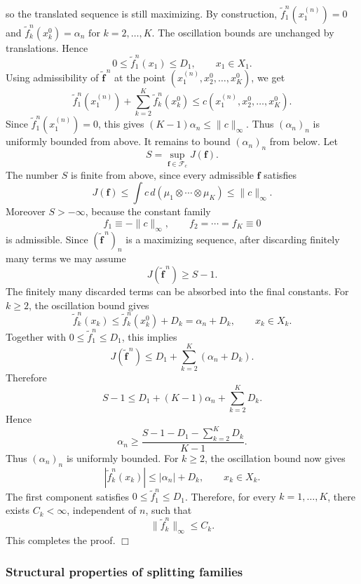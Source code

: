 \documentclass[twoside,11pt,a4paper]{article}
\begin{document}
so the translated sequence is still maximizing.
By construction, $
\widetilde f_1^n(x_1^{(n)})=0$
and $
\widetilde f_k^n(x_k^0)=\alpha_n
\text{ for } k=2,\ldots,K$.
The oscillation bounds are unchanged by translations. Hence
\[
0\le \widetilde f_1^n(x_1)\le D_1,
\qquad x_1\in X_1.
\]
Using admissibility of \(\widetilde{\boldsymbol f}^{\,n}\) at the point
\((x_1^{(n)},x_2^0,\ldots,x_K^0)\), we get
\[
\widetilde f_1^n(x_1^{(n)})
+
\sum_{k=2}^K\widetilde f_k^n(x_k^0)
\le
c(x_1^{(n)},x_2^0,\ldots,x_K^0).
\]
Since \(\widetilde f_1^n(x_1^{(n)})=0\), this gives $
(K-1)\alpha_n\le \|c\|_\infty$.
Thus \((\alpha_n)_n\) is uniformly bounded from above.
It remains to bound \((\alpha_n)_n\) from below. Let
\[
S=\sup_{\boldsymbol f\in\mathcal F_c}J(\boldsymbol f).
\]
The number \(S\) is finite from above, since every admissible
\(\boldsymbol f\) satisfies
\[
J(\boldsymbol f)
\le
\int c\,d(\mu_1\otimes\cdots\otimes\mu_K)
\le
\|c\|_\infty.
\]
Moreover \(S>-\infty\), because the constant family
\[
f_1\equiv-\|c\|_\infty,\qquad f_2=\cdots=f_K\equiv0
\]
is admissible. Since
\((\widetilde{\boldsymbol f}^{\,n})_n\) is a maximizing sequence, after
discarding finitely many terms we may assume
\[
J(\widetilde{\boldsymbol f}^{\,n})\ge S-1.
\]
The finitely many discarded terms can be absorbed into the final constants.
For \(k\ge2\), the oscillation bound gives
\[
\widetilde f_k^n(x_k)
\le
\widetilde f_k^n(x_k^0)+D_k
=
\alpha_n+D_k,
\qquad x_k\in X_k.
\]
Together with \(0\le \widetilde f_1^n\le D_1\), this implies
\[
J(\widetilde{\boldsymbol f}^{\,n})
\le
D_1+\sum_{k=2}^K(\alpha_n+D_k).
\]
Therefore
\[
S-1
\le
D_1+(K-1)\alpha_n+\sum_{k=2}^K D_k.
\]
Hence
\[
\alpha_n
\ge
\frac{S-1-D_1-\sum_{k=2}^K D_k}{K-1}.
\]
Thus \((\alpha_n)_n\) is uniformly bounded.
For \(k\ge2\), the oscillation bound now gives
\[
|\widetilde f_k^n(x_k)|
\le
|\alpha_n|+D_k,
\qquad x_k\in X_k.
\]
The first component satisfies \(0\le\widetilde f_1^n\le D_1\). Therefore, for
every \(k=1,\ldots,K\), there exists \(C_k<\infty\), independent of \(n\), such
that
\[
\|\widetilde f_k^n\|_\infty\le C_k.
\]
This completes the proof.
\hfill\(\Box\)

\subsubsection{Structural properties of splitting families}
\end{document}
